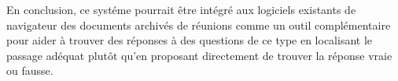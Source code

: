 En conclusion, ce syst\'eme pourrait \^etre int\'egr\'e aux logiciels existants de navigateur des documents archiv\'es de r\'eunions comme un outil compl\'ementaire pour aider \`a trouver des r\'eponses \`a des questions de ce type en localisant le passage ad\'equat plut\^ot qu'en proposant directement de trouver la r\'eponse vraie ou fausse. 

\normalsize
\doublespace



